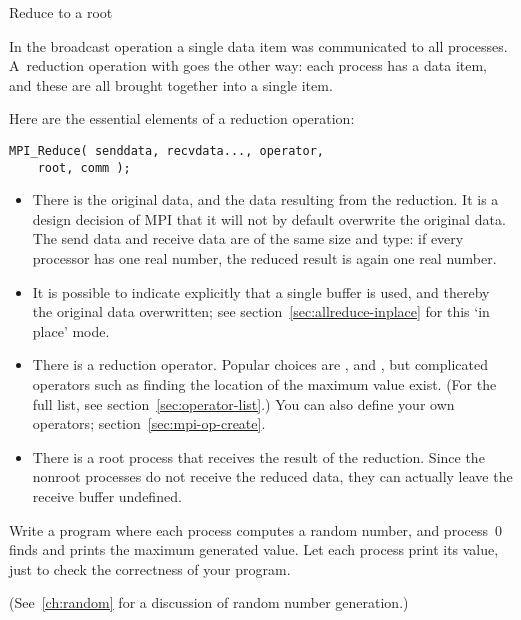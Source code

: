  {Reduce to a root}
\label{sec:reduce-root}

In the broadcast operation a single data item was communicated to all
processes. A~reduction operation with
%
%
goes the other way: each process has a
data item, and these are all brought together into a single item.

Here are the essential elements of a reduction operation:
\begin{lstlisting}
MPI_Reduce( senddata, recvdata..., operator,
    root, comm ); 
\end{lstlisting}
\begin{itemize}
\item There is the original data, and the data resulting from the
  reduction. It is a design decision of MPI that it will not by
  default overwrite the original data. The send data and receive data
  are of the same size and type: if every processor has one real
  number, the reduced result is again one real number.
\item It is possible to indicate explicitly that a single buffer
  is used, and thereby the original data overwritten;
  see section~\ref{sec:allreduce-inplace} for this `in place' mode.
\item There is a reduction operator. Popular choices are
  ,  and
  , but complicated operators such as finding
  the location of the maximum value exist.
  (For the full list, see section~\ref{sec:operator-list}.)
  You can also define your
  own operators; section~\ref{sec:mpi-op-create}.
\item There is a root process that receives the result of the
  reduction. Since the nonroot processes do not receive the reduced
  data, they can actually leave the receive buffer undefined.
\end{itemize}


\begin{exercise}
  \label{ex:randommax}
  Write a program where each process computes a random number, and process~0
  finds and prints the maximum generated value. Let each process print its value,
  just to check the correctness of your program.
\begin{book}
  (See~\ref{ch:random} for a discussion of random number generation.)
\end{book}
\end{exercise}

